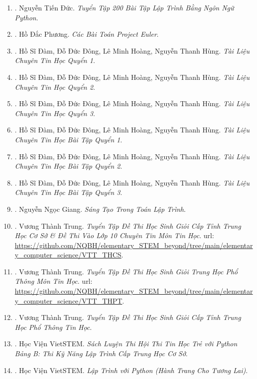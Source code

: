 \documentclass[12pt]{article}
\begin{document}
\begin{enumerate}
	\item \cite{Duc_200_BT_Python}. {\sc Nguyễn Tiến Đức}. {\it Tuyển Tập 200 Bài Tập Lập Trình Bằng Ngôn Ngữ Python}.
	\item \cite{Phuong_project_Euler}. {\sc Hồ Đắc Phương}. {\it Các Bài Toán Project Euler}.
	\item \cite{TL_chuyen_Tin_quyen_1}. {\sc Hồ Sĩ Đàm, Đỗ Đức Đông, Lê Minh Hoàng, Nguyễn Thanh Hùng}. {\it Tài Liệu Chuyên Tin Học Quyển 1}.
	\item \cite{TL_chuyen_Tin_quyen_2}. {\sc Hồ Sĩ Đàm, Đỗ Đức Đông, Lê Minh Hoàng, Nguyễn Thanh Hùng}. {\it Tài Liệu Chuyên Tin Học Quyển 2}.
	\item \cite{TL_chuyen_Tin_quyen_3}. {\sc Hồ Sĩ Đàm, Đỗ Đức Đông, Lê Minh Hoàng, Nguyễn Thanh Hùng}. {\it Tài Liệu Chuyên Tin Học Quyển 3}.
	\item \cite{TL_chuyen_Tin_BT_quyen_1}. {\sc Hồ Sĩ Đàm, Đỗ Đức Đông, Lê Minh Hoàng, Nguyễn Thanh Hùng}. {\it Tài Liệu Chuyên Tin Học Bài Tập Quyển 1}.
	\item \cite{TL_chuyen_Tin_BT_quyen_2}. {\sc Hồ Sĩ Đàm, Đỗ Đức Đông, Lê Minh Hoàng, Nguyễn Thanh Hùng}. {\it Tài Liệu Chuyên Tin Học Bài Tập Quyển 2}.
	\item \cite{TL_chuyen_Tin_BT_quyen_3}. {\sc Hồ Sĩ Đàm, Đỗ Đức Đông, Lê Minh Hoàng, Nguyễn Thanh Hùng}. {\it Tài Liệu Chuyên Tin Học Bài Tập Quyển 3}.
	\item \cite{Giang_sang_tao_lap_trinh}. {\sc Nguyễn Ngọc Giang}. {\it Sáng Tạo Trong Toán Lập Trình}.
	\item \cite{Trung_THCS_Tin}. {\sc Vương Thành Trung}. {\it Tuyển Tập Đề Thi Học Sinh Giỏi Cấp Tỉnh Trung Học Cơ Sở \& Đề Thi Vào Lớp 10 Chuyên Tin Môn Tin Học}. {\sc url}: \url{https://github.com/NQBH/elementary_STEM_beyond/tree/main/elementary_computer_science/VTT_THCS}.
	\item \cite{Trung_THPT_Tin}. {\sc Vương Thành Trung}. {\it Tuyển Tập Đề Thi Học Sinh Giỏi Trung Học Phổ Thông Môn Tin Học}. {\sc url}: \url{https://github.com/NQBH/elementary_STEM_beyond/tree/main/elementary_computer_science/VTT_THPT}.
	\item \cite{Trung_HSG_THPT_Tin}. {\sc Vương Thành Trung}. {\it Tuyển Tập Đề Thi Học Sinh Giỏi Cấp Tỉnh Trung Học Phổ Thông Tin Học}.
	\item \cite{VietSTEM2021}. {\sc Học Viện VietSTEM}. {\it Sách Luyện Thi Hội Thi Tin Học Trẻ  với Python Bảng B: Thi Kỹ Năng Lập Trình Cấp Trung Học Cơ Sở}.
	\item \cite{VietSTEM2022}. {\sc Học Viện VietSTEM}. {\it Lập Trình với Python (Hành Trang Cho Tương Lai)}.
\end{enumerate}
\end{document}
